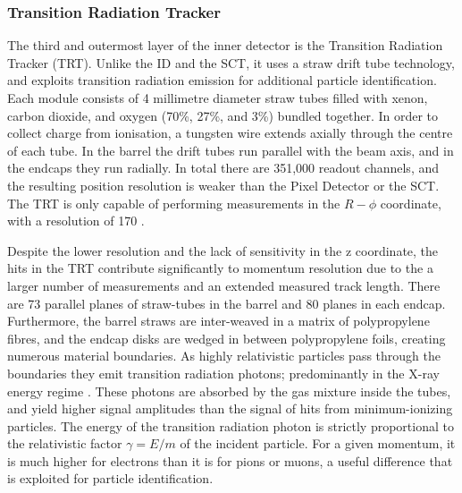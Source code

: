 \subsubsection{Transition Radiation Tracker}

The third and outermost layer of the inner detector is the Transition Radiation Tracker (TRT). Unlike the ID and the SCT, it uses a straw drift tube technology, and exploits transition radiation emission for additional particle identification. Each module consists of 4 millimetre diameter straw tubes filled with xenon, carbon dioxide, and oxygen (70\%, 27\%, and 3\%)\cite{Vogel:1537991} bundled together. In order to collect charge from ionisation, a tungsten wire extends axially through the centre of each tube. In the barrel the drift tubes run parallel with the beam axis, and in the endcaps they run radially. In total there are 351,000 readout channels, and the resulting position resolution is weaker than the Pixel Detector or the SCT. The TRT is only capable of performing measurements in the $R-\phi$ coordinate, with a resolution of \unit{170}{\mu\meter} \cite{missing}. 

Despite the lower resolution and the lack of sensitivity in the z coordinate, the hits in the TRT contribute significantly to momentum resolution due to the a larger number of measurements and an extended measured track length. There are 73 parallel planes of straw-tubes in the barrel and 80 planes in each endcap. Furthermore, the barrel straws are inter-weaved in a matrix of polypropylene fibres, and the endcap disks are wedged in between polypropylene foils, creating numerous material boundaries. As highly relativistic particles pass through the boundaries they emit transition radiation photons; predominantly in the X-ray energy regime \cite{Ginzburg_1996}. These photons are absorbed by the gas mixture inside the tubes, and yield higher signal amplitudes than the signal of hits from minimum-ionizing particles. The energy of the transition radiation photon is strictly proportional to the relativistic factor $\gamma=E/m$ of the incident particle. For a given momentum, it is much higher for electrons than it is for pions or muons, a useful difference that is exploited for particle identification.

